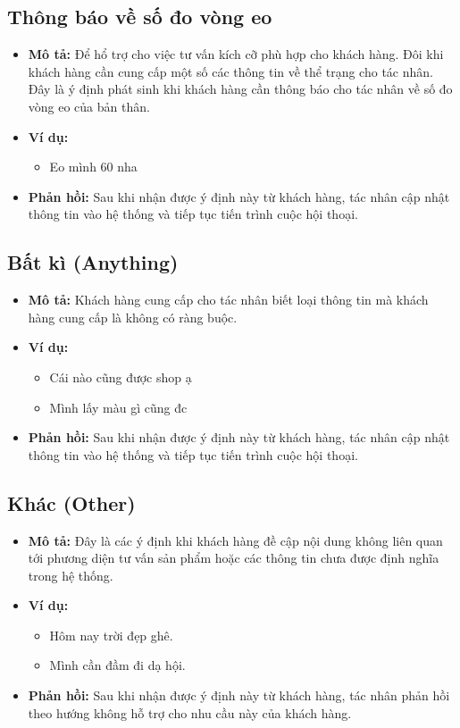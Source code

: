 \subsection{Thông báo về số đo vòng eo}
\begin{itemize}
    \item \textbf{Mô tả:} Để hổ trợ cho việc tư vấn kích cỡ phù hợp cho khách hàng. Đôi khi khách hàng cần cung cấp một số các thông tin về thể trạng cho tác nhân. Đây là ý định phát sinh khi khách hàng cần thông báo cho tác nhân về số đo vòng eo của bản thân.
    \item \textbf{Ví dụ:}
    \begin{itemize}
        \item Eo mình 60 nha
    \end{itemize}
    \item \textbf{Phản hồi:} Sau khi nhận được ý định này từ khách hàng, tác nhân cập nhật thông tin vào hệ thống và tiếp tục tiến trình cuộc hội thoại.
\end{itemize}

\subsection{Bất kì (Anything)}
\begin{itemize}
    \item \textbf{Mô tả:} Khách hàng cung cấp cho tác nhân biết loại thông tin mà khách hàng cung cấp là không có ràng buộc.
    \item \textbf{Ví dụ:}
    \begin{itemize}
        \item Cái nào cũng được shop ạ
        \item Mình lấy màu gì cũng đc
    \end{itemize}
    \item \textbf{Phản hồi:} Sau khi nhận được ý định này từ khách hàng, tác nhân cập nhật thông tin vào hệ thống và tiếp tục tiến trình cuộc hội thoại.
\end{itemize}

\subsection{Khác (Other)}
\begin{itemize}
    \item \textbf{Mô tả:} Đây là các ý định khi khách hàng đề cập nội dung không liên quan tới phương diện tư vấn sản phẩm hoặc các thông tin chưa được định nghĩa trong hệ thống.
    \item \textbf{Ví dụ:}
    \begin{itemize}
        \item Hôm nay trời đẹp ghê.
        \item Mình cần đầm đi dạ hội.
    \end{itemize}
    \item \textbf{Phản hồi:} Sau khi nhận được ý định này từ khách hàng, tác nhân phản hồi theo hướng không hỗ trợ cho nhu cầu này của khách hàng.
\end{itemize}

